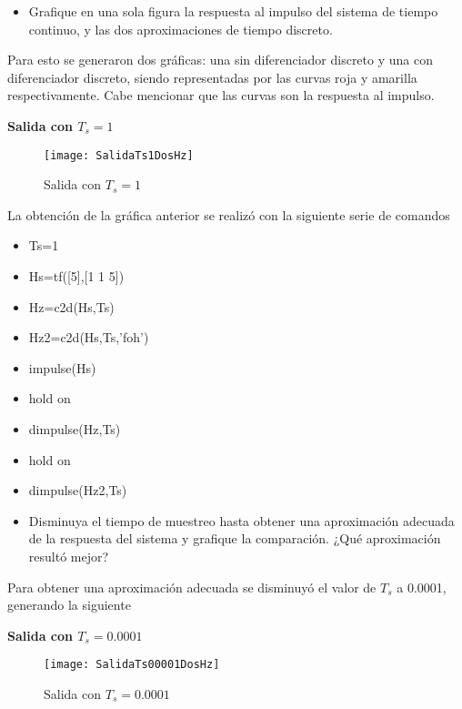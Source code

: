 
\begin{itemize}
	\item Grafique en una sola figura la respuesta al impulso del sistema de tiempo continuo, y las dos aproximaciones
	de tiempo discreto.
\end{itemize}

Para esto se generaron dos gráficas: una sin diferenciador discreto y una con diferenciador discreto, siendo representadas por las curvas roja y amarilla respectivamente. Cabe mencionar que las curvas son la respuesta al impulso.

\noindent \textbf{Salida con $T_s=1$}

\begin{figure}[H]
	\centering
	\texttt{[image: SalidaTs1DosHz]}
	\caption{{Salida con $T_s=1$}}
	\label{fig:salidaTs01-1}
\end{figure}



La obtención de la gráfica anterior se realizó con la siguiente serie de comandos

\begin{itemize}
\item Ts=1
\item Hs=tf([5],[1 1 5])
\item Hz=c2d(Hs,Ts)
\item Hz2=c2d(Hs,Ts,'foh')
\item impulse(Hs)
\item hold on
\item dimpulse(Hz,Ts)
\item hold on
\item dimpulse(Hz2,Ts)
\end{itemize}

\begin{itemize}
	\item Disminuya el tiempo de muestreo hasta obtener una aproximación adecuada de la respuesta del sistema
	y grafique la comparación. ¿Qué aproximación resultó mejor?
\end{itemize}

Para obtener una aproximación adecuada se disminuyó el valor de $T_s$ a 0.0001, generando la siguiente 
\newline

\noindent \textbf{Salida con $T_s=0.0001$}

\begin{figure}[H]
	\centering
	\texttt{[image: SalidaTs00001DosHz]}
	\caption{{Salida con $T_s=0.0001$}}
	\label{fig:salidaTs001-1}
\end{figure}

